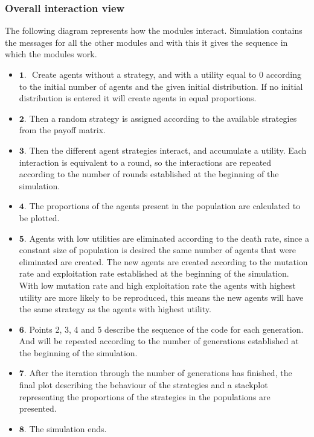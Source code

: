 \documentclass{book}
\begin{document}
\newpage
\subsubsection{Overall interaction view}
The following diagram represents how the modules interact. Simulation contains the messages for all the other modules and with this it gives the sequence in which the modules work. 

\begin{itemize}
   \item $\textbf{1. }$ Create agents without a strategy, and with a utility equal to 0 according to the initial number of agents and the given initial distribution. If no initial distribution is entered it will create agents in equal proportions. 
   \item $\textbf{2. }$Then a random strategy is assigned according to the available strategies from the payoff matrix.
   \item $\textbf{3. }$Then the different agent strategies interact, and accumulate a utility. Each interaction is equivalent to a round, so the interactions are repeated according to the number of rounds established at the beginning of the simulation.
   \item $\textbf{4. }$The proportions of the agents present in the population are calculated to be plotted.
   \item $\textbf{5. }$Agents with low utilities are eliminated according to the death rate, since a constant size of population is desired  the same number of agents that were eliminated are created. The new agents are created according to the mutation rate and exploitation rate established at the beginning of the simulation. With low mutation rate and high exploitation rate the agents with highest utility are more likely to be reproduced, this means the new agents will have the same strategy as the agents with highest utility.
   \item $\textbf{6. }$Points 2, 3, 4 and 5 describe the sequence of the code for each generation. And will be repeated according to the number of generations established at the beginning of the simulation.
   \item $\textbf{7. }$After the iteration through the number of generations has finished, the final plot describing the behaviour of the strategies and a stackplot representing the proportions of the strategies in the populations are presented.
   \item $\textbf{8. }$The simulation ends.
\end{itemize}
\end{document}
